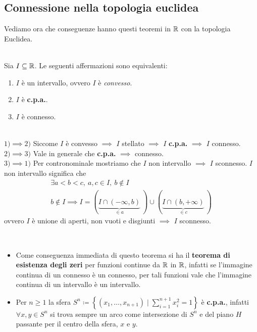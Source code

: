 \subsection{Connessione nella topologia euclidea}
Vediamo ora che conseguenze hanno questi teoremi in $\mathbb{R}$ con la topologia Euclidea.
\begin{theorema}~{}\\
	Sia $I\subseteq \mathbb{R}$. Le seguenti affermazioni sono equivalenti:
		\begin{enumerate}
	\item $I$ è un intervallo, ovvero $I$ è \textit{convesso}.
	\item $I$ è \textbf{c.p.a.}.
	\item $I$ è connesso.
		\end{enumerate}
	\vspace{-3mm}
\end{theorema}
\begin{demonstration}~{}\\
	$1) \implies 2)$ Siccome $I$ è convesso $\implies$ $I$ stellato $\implies$ $I$ \textbf{c.p.a.} $\implies$ $I$ connesso. \\
	$2) \implies 3)$ Vale in generale che \textbf{c.p.a.} $\implies$ connesso.\\
	$3) \implies 1)$ Per contronominale mostriamo che $I$ non intervallo $\implies$ $I$ sconnesso. $I$ non intervallo significa che
		\begin{gather*}
			\exists a<b<c,\ a,c\in I,\ b\notin I \\
			b\notin I \implies I= \left(\underbrace{ I\cap \left(-\infty ,b\right)}_{\in a}\ \right) \cup \left( \underbrace{I\cap \left(b ,+\infty\right)}_{\in c}\ \right)
		\end{gather*}
	ovvero $I$ è unione di aperti, non vuoti e disgiunti $\implies$ $I$ sconnesso.	
\end{demonstration}
\begin{observe}~{}\label{teorema esistenza zeri funzioni continue, s^n cpa}
		\begin{itemize}
	\item Come conseguenza immediata di questo teorema si ha il \textbf{teorema di esistenza degli zeri} per funzioni continue da $\mathbb{R}$ in $\mathbb{R}$, infatti se l'immagine continua di un connesso è un connesso, per tali funzioni vale che l'immagine continua di un intervallo è un intervallo.
	\item Per $n\geq 1$ la sfera $\displaystyle S^n \coloneqq \left\{ \left(x_1,\dots,x_{n+1}\right) \mid \sum_{i=1}^{n+1}x_i^2=1 \right\}$ è \textbf{c.p.a.}, infatti $\forall x,y\in S^n$ si trova sempre un arco come intersezione di $S^n$ e del piano $H$ passante per il centro della sfera, $x$ e $y$.
		\end{itemize}
	\vspace{-3mm}
\end{observe}
